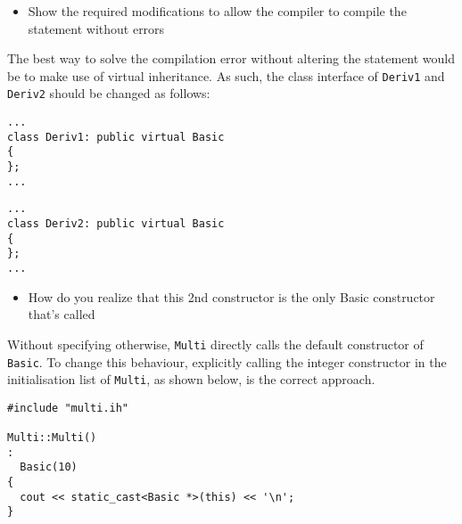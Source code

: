 \begin{itemize}
  \item Show the required modifications to allow the compiler to compile the statement without errors
\end{itemize}

The best way to solve the compilation error without altering the statement would be to make use of virtual inheritance. As such, the class interface of \texttt{Deriv1} and \texttt{Deriv2} should be changed as follows: \\

\begin{lstlisting}[style=in, caption=deriv1.h]
...
class Deriv1: public virtual Basic
{
};
...
\end{lstlisting}
\begin{lstlisting}[style=in, caption=deriv2.h]
...
class Deriv2: public virtual Basic
{
};
...
\end{lstlisting}

\begin{itemize}
  \item How do you realize that this 2nd constructor is the only Basic constructor that's called
\end{itemize}
Without specifying otherwise, \texttt{Multi} directly calls the default constructor of \texttt{Basic}. To change this behaviour, explicitly calling the integer constructor in the initialisation list of \texttt{Multi}, as shown below, is the correct approach.
\begin{lstlisting}[style=in, caption=c\_multi.cc]
#include "multi.ih"

Multi::Multi()
:
  Basic(10)
{
  cout << static_cast<Basic *>(this) << '\n';
}
\end{lstlisting}
